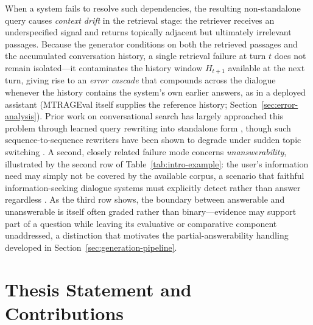 When a system fails to resolve such dependencies, the resulting non-standalone query causes \textit{context drift} in the retrieval stage: the retriever receives an underspecified signal and returns topically adjacent but ultimately irrelevant passages. Because the generator conditions on both the retrieved passages and the accumulated conversation history, a single retrieval failure at turn $t$ does not remain isolated---it contaminates the history window $H_{t+1}$ available at the next turn, giving rise to an \textit{error cascade} that compounds across the dialogue whenever the history contains the system's own earlier answers, as in a deployed assistant (MTRAGEval itself supplies the reference history; Section~\ref{sec:error-analysis}). Prior work on conversational search has largely approached this problem through learned query rewriting into standalone form \citep{vakulenko2021question, anantha2021open}, though such sequence-to-sequence rewriters have been shown to degrade under sudden topic switching \citep{adlakha2022topiocqa}. A second, closely related failure mode concerns \textit{unanswerability}, illustrated by the second row of Table~\ref{tab:intro-example}: the user's information need may simply not be covered by the available corpus, a scenario that faithful information-seeking dialogue systems must explicitly detect rather than answer regardless \citep{dziri2022faithdial}. As the third row shows, the boundary between answerable and unanswerable is itself often graded rather than binary---evidence may support part of a question while leaving its evaluative or comparative component unaddressed, a distinction that motivates the partial-answerability handling developed in Section~\ref{sec:generation-pipeline}.

\section{Thesis Statement and Contributions}
\label{sec:intro-contributions}

